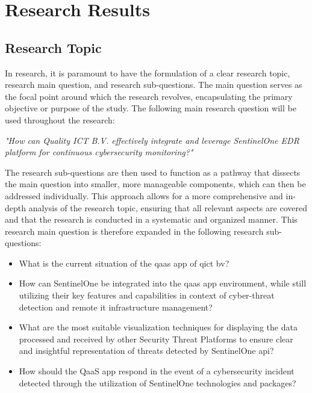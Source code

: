 \chapter{Research Results}
\begin{multicols}{2}
      \section{Research Topic}
      In research, it is paramount to have the formulation of a clear research topic, research main question,
      and research sub-questions. The main question serves as the focal point around which the research revolves,
      encapsulating the primary objective or purpose of the study.
      The following main research question will be used throughout the research:
      \begin{center}
            \textit{"How can Quality ICT B.V. effectively integrate and leverage SentinelOne EDR platform
                  for continuous cybersecurity monitoring?"}
      \end{center}
      The research sub-questions are then used to function as a pathway that dissects the main
      question into smaller, more manageable components, which can then be addressed individually. This approach
      allows for a more comprehensive and in-depth analysis of the research topic, ensuring that all relevant
      aspects are covered and that the research is conducted in a systematic and organized manner.
      This research main question is therefore expanded in the following research sub-questions:
      \begin{itemize}
            \item What is the current situation of the \acrshort{qaas} app of \acrlong{qict} \acrshort{bv}?
            \item How can SentinelOne be integrated into the \acrshort{qaas} app environment, while still
                  utilizing their key features and capabilities in context of cyber-threat detection and
                  remote \acrshort{it} infrastructure management?
            \item What are the most suitable visualization techniques for displaying the data processed and
                  received by other Security Threat Platforms to ensure clear and insightful representation
                  of threats detected by SentinelOne \acrshort{api}?
            \item How should the QaaS app respond in the event of a cybersecurity incident detected through
                  the utilization of SentinelOne technologies and packages?
      \end{itemize}

\end{multicols}
